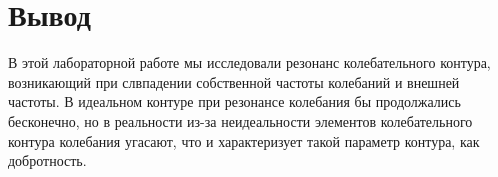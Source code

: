 \documentclass[a4paper, fontsize=14pt]{article}
\begin{document}
\section*{Вывод}
В этой лабораторной работе мы исследовали резонанс колебательного контура, возникающий при слвпадении собственной частоты колебаний и внешней частоты. В идеальном контуре при резонансе колебания бы продолжались бесконечно, но в реальности из-за неидеальности элементов колебательного контура колебания угасают, что и характеризует такой параметр контура, как добротность.
\end{document}
